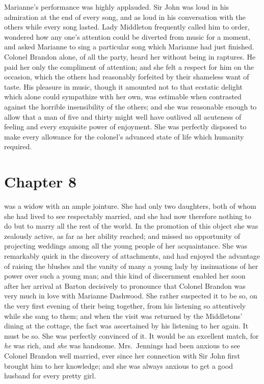 Marianne's performance was highly applauded.
Sir John was loud in his admiration at the end of every song,
and as loud in his conversation with the others while every
song lasted.  Lady Middleton frequently called him to order,
wondered how any one's attention could be diverted from music
for a moment, and asked Marianne to sing a particular song
which Marianne had just finished.  Colonel Brandon alone,
of all the party, heard her without being in raptures.
He paid her only the compliment of attention; and she felt
a respect for him on the occasion, which the others had
reasonably forfeited by their shameless want of taste.
His pleasure in music, though it amounted not to that
ecstatic delight which alone could sympathize with her own,
was estimable when contrasted against the horrible
insensibility of the others; and she was reasonable enough
to allow that a man of five and thirty might well have
outlived all acuteness of feeling and every exquisite
power of enjoyment.  She was perfectly disposed to make
every allowance for the colonel's advanced state of life
which humanity required.



\chapter{Chapter 8}


 was a widow with an ample jointure.
She had only two daughters, both of whom she had lived
to see respectably married, and she had now therefore
nothing to do but to marry all the rest of the world.
In the promotion of this object she was zealously active,
as far as her ability reached; and missed no opportunity
of projecting weddings among all the young people
of her acquaintance.  She was remarkably quick in the
discovery of attachments, and had enjoyed the advantage
of raising the blushes and the vanity of many a young
lady by insinuations of her power over such a young man;
and this kind of discernment enabled her soon after her
arrival at Barton decisively to pronounce that Colonel
Brandon was very much in love with Marianne Dashwood.
She rather suspected it to be so, on the very first
evening of their being together, from his listening
so attentively while she sang to them; and when the visit
was returned by the Middletons' dining at the cottage,
the fact was ascertained by his listening to her again.
It must be so.  She was perfectly convinced of it.
It would be an excellent match, for \emph{he} was rich, and \emph{she}
was handsome.  Mrs.\ Jennings had been anxious to see
Colonel Brandon well married, ever since her connection
with Sir John first brought him to her knowledge;
and she was always anxious to get a good husband for every
pretty girl.

